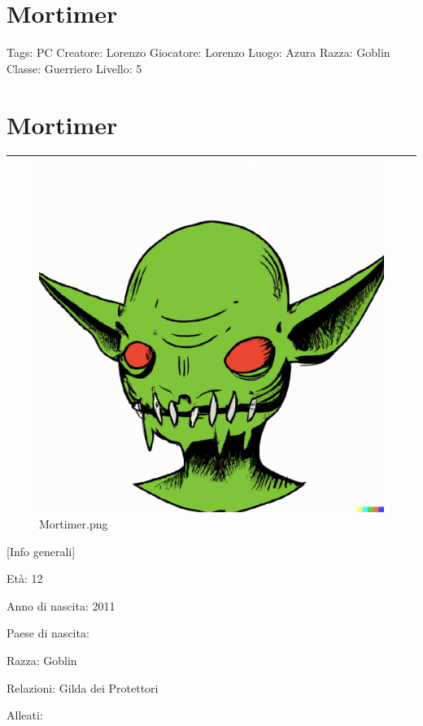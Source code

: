 \section{Mortimer}\label{mortimer}

Tags: PC Creatore: Lorenzo Giocatore: Lorenzo Luogo: Azura Razza: Goblin
Classe: Guerriero Livello: 5

\section{Mortimer}\label{mortimer-1}

\begin{center}\rule{0.5\linewidth}{0.5pt}\end{center}

\begin{figure}
\centering
\includegraphics{Mortimer.png}
\caption{Mortimer.png}
\end{figure}

{[}Info generali{]}

Età: 12

Anno di nascita: 2011

Paese di nascita:

Razza: Goblin

Relazioni: Gilda dei Protettori

Alleati:

